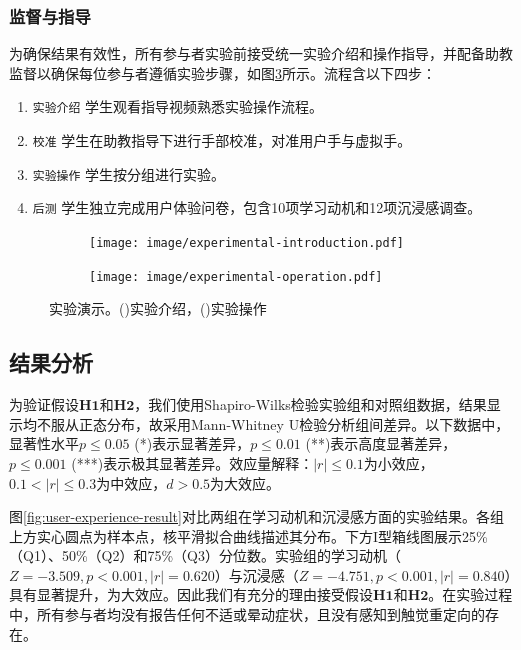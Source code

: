 \documentclass[runningheads]{llncs}
\begin{document}
\subsubsection{监督与指导}
为确保结果有效性，所有参与者实验前接受统一实验介绍和操作指导，并配备助教监督以确保每位参与者遵循实验步骤，如图\ref{fig:experimental-procedure}所示。流程含以下四步：

\begin{enumerate}[label={\arabic*)}]
\item \texttt{实验介绍} 学生观看指导视频熟悉实验操作流程。
\item \texttt{校准} 学生在助教指导下进行手部校准，对准用户手与虚拟手。
\item \texttt{实验操作} 学生按分组进行实验。
\item \texttt{后测} 学生独立完成用户体验问卷，包含10项学习动机和12项沉浸感调查。
\end{enumerate}

\begin{figure}
  \begin{subfigure}{0.48\linewidth}
    \centering
    \texttt{[image: image/experimental-introduction.pdf]}
    \caption{}
    \label{fig:experimental-introduction}
  \end{subfigure}
  \hfill
  \begin{subfigure}{0.48\linewidth}
    \centering
    \texttt{[image: image/experimental-operation.pdf]}
    \caption{}
    \label{fig:experimental-operation}
  \end{subfigure}
  \caption{实验演示。()实验介绍，()实验操作}
  \label{fig:experimental-procedure}
\end{figure}

\subsection{结果分析}

为验证假设$\textbf{H1}$和$\textbf{H2}$，我们使用Shapiro-Wilks检验实验组和对照组数据，结果显示均不服从正态分布，故采用Mann-Whitney U检验分析组间差异。以下数据中，显著性水平$p \le 0.05$ (*)表示显著差异，$p \le 0.01$ (**)表示高度显著差异，$p \le 0.001$ (***)表示极其显著差异。效应量解释：$|r| \le 0.1$为小效应，$0.1 < |r| \le  0.3$为中效应，$d > 0.5$为大效应。

图\ref{fig:user-experience-result}对比两组在学习动机和沉浸感方面的实验结果。各组上方实心圆点为样本点，核平滑拟合曲线描述其分布。下方I型箱线图展示25\%（Q1）、50\%（Q2）和75\%（Q3）分位数。实验组的学习动机（$Z=-3.509,p<0.001,|r|=0.620$）与沉浸感（$Z=-4.751,p<0.001,|r|=0.840$）具有显著提升，为大效应。因此我们有充分的理由接受假设$\textbf{H1}$和$\textbf{H2}$。在实验过程中，所有参与者均没有报告任何不适或晕动症状，且没有感知到触觉重定向的存在。
\end{document}
